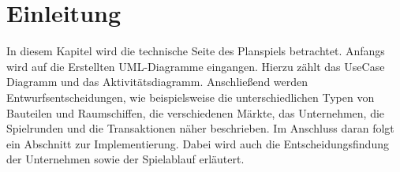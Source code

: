 \section{Einleitung}
\label{sec:fachkonzept-einleitung}


In diesem Kapitel wird die technische Seite des Planspiels betrachtet. Anfangs wird auf die Erstellten UML-Diagramme eingangen. Hierzu zählt das UseCase Diagramm und das Aktivitätsdiagramm. Anschließend werden Entwurfsentscheidungen, wie beispielsweise die unterschiedlichen Typen von Bauteilen und Raumschiffen, die verschiedenen Märkte, das Unternehmen, die Spielrunden und die Transaktionen näher beschrieben. Im Anschluss daran folgt ein Abschnitt zur Implementierung. Dabei wird auch die Entscheidungsfindung der Unternehmen sowie der Spielablauf erläutert. 